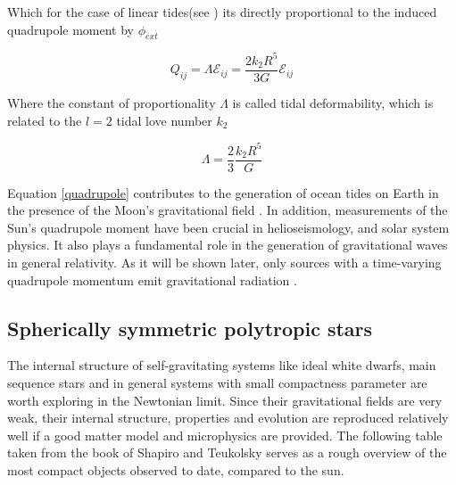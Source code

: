 Which for the case of linear tides(see \cite{poisson_will_2014, Hinderer:2007mb}) its directly proportional to the induced quadrupole moment by $\phi_{ext}$

\begin{equation}
Q_{ij} = \Lambda \mathcal{E}_{ij} = \frac{2k_2 R^5}{3G} \mathcal{E}_{ij}
\end{equation}

Where the constant of proportionality $\Lambda$ is called tidal deformability, which is related to the $l=2$ tidal love number $k_2$

\begin{equation}\label{Tid}
\Lambda = \frac{2}{3}\frac{k_2 R^5}{G}
\end{equation}

Equation \ref{quadrupole} contributes to the generation of ocean tides on Earth in the presence of the Moon's gravitational field \cite{Hartle:2021pel}. In addition, measurements of the Sun's quadrupole moment have been crucial in helioseismology, and solar system physics. It also plays a fundamental role in the generation of gravitational waves in general relativity. As it will be shown later, only sources with a time-varying quadrupole momentum emit gravitational radiation \cite{Creighton:2011zz}.

\subsection{Spherically symmetric polytropic stars}

The internal structure of self-gravitating systems like ideal white dwarfs, main sequence stars and in general systems with small compactness parameter are worth exploring in the Newtonian limit. Since their gravitational fields are very weak, their internal structure, properties and evolution are reproduced relatively well if a good matter model and microphysics are provided. The following table taken from the book of Shapiro and Teukolsky \cite{Shapiro:1983du} serves as a rough overview of the most compact objects observed to date, compared to the sun.
\vspace{1cm}

